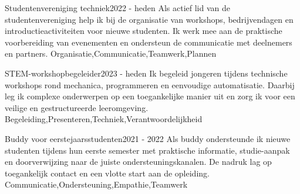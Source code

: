 \begin{vrijwilligerswerk}
    \vrijwilliger
    {Studentenvereniging techniek}{2022 - heden}
    {Als actief lid van de studentenvereniging help ik bij de organisatie van workshops, bedrijvendagen en introductieactiviteiten voor nieuwe studenten. Ik werk mee aan de praktische voorbereiding van evenementen en ondersteun de communicatie met deelnemers en partners.}
    {Organisatie,Communicatie,Teamwerk,Plannen}

    \vrijwilliger
    {STEM-workshopbegeleider}{2023 - heden}
    {Ik begeleid jongeren tijdens technische workshops rond mechanica, programmeren en eenvoudige automatisatie. Daarbij leg ik complexe onderwerpen op een toegankelijke manier uit en zorg ik voor een veilige en gestructureerde leeromgeving.}
    {Begeleiding,Presenteren,Techniek,Verantwoordelijkheid}

    \vrijwilliger
    {Buddy voor eerstejaarsstudenten}{2021 - 2022}
    {Als buddy ondersteunde ik nieuwe studenten tijdens hun eerste semester met praktische informatie, studie-aanpak en doorverwijzing naar de juiste ondersteuningskanalen. De nadruk lag op toegankelijk contact en een vlotte start aan de opleiding.}
    {Communicatie,Ondersteuning,Empathie,Teamwerk}
\end{vrijwilligerswerk}
